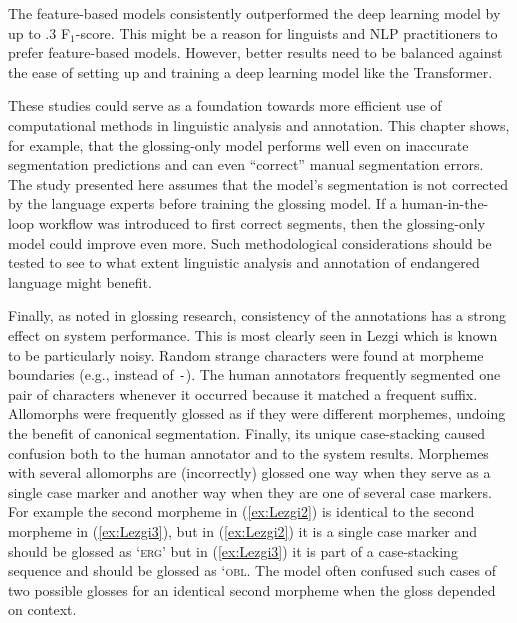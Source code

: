 The feature-based models consistently outperformed the deep learning model by up to .3 F$_1$-score. This might be a reason for linguists and NLP practitioners to prefer feature-based models. However, better results need to be balanced against the ease of setting up and training a deep learning model like the Transformer. 

These studies could serve as a foundation towards more efficient use of computational methods in linguistic analysis and annotation. This chapter shows, for example, that the glossing-only model performs well even on inaccurate segmentation predictions and can even ``correct'' manual segmentation errors. The study presented here assumes that the model's segmentation is not corrected by the language experts before training the glossing model. If a human-in-the-loop workflow was introduced to first correct segments, then the glossing-only model could improve even more. Such methodological considerations should be tested to see to what extent linguistic analysis and annotation of endangered language might benefit.

Finally, as \citet{mcmillan-major_automating_2020} noted in glossing research, consistency of the annotations has a strong effect on system performance. This is most clearly seen in Lezgi which is known to be particularly noisy. Random strange characters were found at morpheme boundaries (e.g., {\tt *} instead of  {\tt -}). The human annotators frequently segmented one pair of characters whenever it occurred because it matched a frequent suffix. Allomorphs were frequently glossed as if they were different morphemes, undoing the benefit of canonical segmentation. Finally, its unique case-stacking caused confusion both to the human annotator and to the system results. Morphemes with several allomorphs are (incorrectly) glossed one way when they serve as a single case marker and another way when they are one of several case markers. For example the second morpheme in (\ref{ex:Lezgi2}) is identical to the second morpheme in (\ref{ex:Lezgi3}), but in (\ref{ex:Lezgi2}) it is a single case marker and should be glossed as `\textsc{erg}' but in (\ref{ex:Lezgi3}) it is part of a case-stacking sequence and should be glossed as `\textsc{obl}. The model often confused such cases of two possible glosses for an identical second morpheme when the gloss depended on context.

